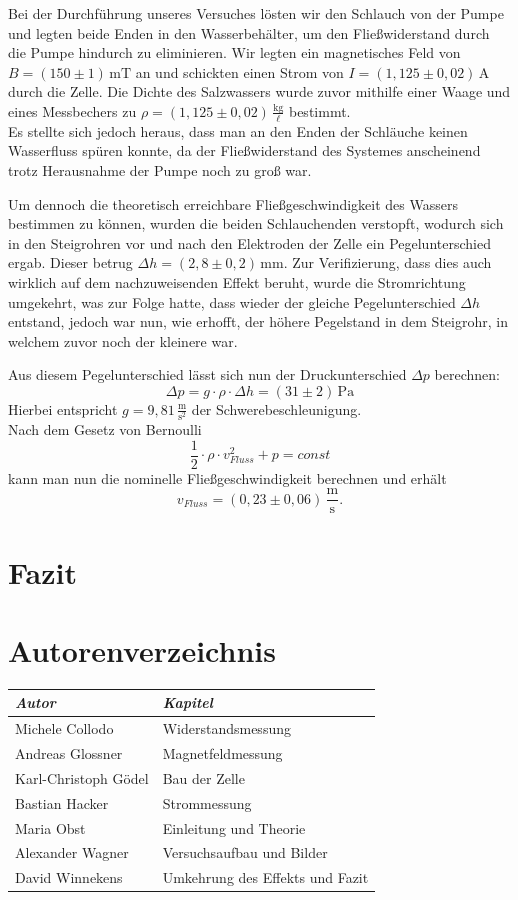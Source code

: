\documentclass[11pt]{scrartcl}
\newcommand{\unit}[1]{\ensuremath{\,\mathrm{#1}}} %
\begin{document}
Bei der Durchführung unseres Versuches lösten wir den Schlauch von der Pumpe und legten beide Enden in den Wasserbehälter, um den Fließwiderstand durch die Pumpe hindurch zu eliminieren. Wir legten ein magnetisches Feld von $ B = (150 \pm 1) \unit{mT} $ an und schickten einen Strom von $I = (1,125 \pm 0,02) \unit{A}$ durch die Zelle. Die Dichte des Salzwassers wurde zuvor mithilfe einer Waage und eines Messbechers zu $\rho = (1,125 \pm 0,02) \unit{\frac{kg}{\ell}}$ bestimmt.\\
Es stellte sich jedoch heraus, dass man an den Enden der Schläuche keinen Wasserfluss spüren konnte, da der Fließwiderstand des Systemes anscheinend trotz Herausnahme der Pumpe noch zu groß war.

Um dennoch die theoretisch erreichbare Fließgeschwindigkeit des Wassers bestimmen zu können, wurden die beiden Schlauchenden verstopft, wodurch sich in den Steigrohren vor und nach den Elektroden der Zelle ein Pegelunterschied ergab. Dieser betrug $\Delta h = (2,8 \pm 0,2) \unit{mm}$. Zur Verifizierung, dass dies auch wirklich auf dem nachzuweisenden Effekt beruht, wurde die Stromrichtung umgekehrt, was zur Folge hatte, dass wieder der gleiche Pegelunterschied $\Delta h$ entstand, jedoch war nun, wie erhofft, der höhere Pegelstand in dem Steigrohr, in welchem zuvor noch der kleinere war.

Aus diesem Pegelunterschied lässt sich nun der Druckunterschied $\Delta p$ berechnen:
\[\Delta p = g \cdot \rho \cdot \Delta h = (31 \pm 2) \unit{Pa} \]
Hierbei entspricht $g = 9,81 \unit{\frac{m}{s^2}}$ der Schwerebeschleunigung.\\
Nach dem Gesetz von Bernoulli \[\frac{1}{2}\cdot\rho\cdot v^2_{Fluss} + p = const\]
kann man nun die nominelle Fließgeschwindigkeit berechnen und erhält \[v_{Fluss} = (0,23 \pm 0,06)\unit{\frac{m}{s}}.\]



\section{Fazit}		%

\newpage
\section{Autorenverzeichnis}
\begin{tabular}{|l|l|}
\hline
\emph{Autor} & \emph{Kapitel}\\
\hline
Michele Collodo & Widerstandsmessung\\
Andreas Glossner & Magnetfeldmessung\\
Karl-Christoph G\"odel & Bau der Zelle\\
Bastian Hacker & Strommessung\\
Maria Obst & Einleitung und Theorie\\
Alexander Wagner & Versuchsaufbau und Bilder\\
David Winnekens & Umkehrung des Effekts und Fazit\\
\hline
\end{tabular}
\end{document}
